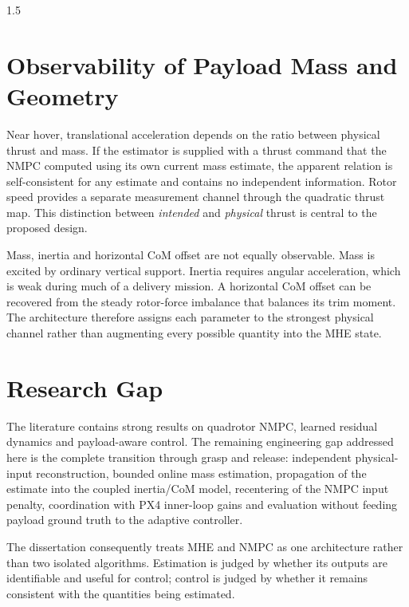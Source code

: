 \begin{spacing}{1.5}
\section{Observability of Payload Mass and Geometry}

Near hover, translational acceleration depends on the ratio between physical thrust and mass. If the estimator is supplied with a thrust command that the NMPC computed using its own current mass estimate, the apparent relation is self-consistent for any estimate and contains no independent information. Rotor speed provides a separate measurement channel through the quadratic thrust map. This distinction between \emph{intended} and \emph{physical} thrust is central to the proposed design.

Mass, inertia and horizontal CoM offset are not equally observable. Mass is excited by ordinary vertical support. Inertia requires angular acceleration, which is weak during much of a delivery mission. A horizontal CoM offset can be recovered from the steady rotor-force imbalance that balances its trim moment. The architecture therefore assigns each parameter to the strongest physical channel rather than augmenting every possible quantity into the MHE state.

\section{Research Gap}

The literature contains strong results on quadrotor NMPC, learned residual dynamics and payload-aware control. The remaining engineering gap addressed here is the complete transition through grasp and release: independent physical-input reconstruction, bounded online mass estimation, propagation of the estimate into the coupled inertia/CoM model, recentering of the NMPC input penalty, coordination with PX4 inner-loop gains and evaluation without feeding payload ground truth to the adaptive controller.

The dissertation consequently treats MHE and NMPC as one architecture rather than two isolated algorithms. Estimation is judged by whether its outputs are identifiable and useful for control; control is judged by whether it remains consistent with the quantities being estimated.

\end{spacing}
\newpage
